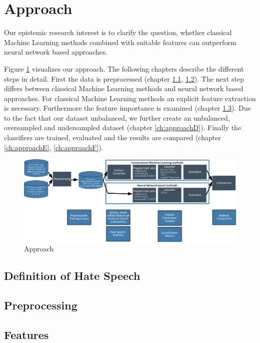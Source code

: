 \section{Approach} 
\label{approach}

Our epistemic research interest is to clarify the question, whether classical Machine Learning methods combined with suitable features can outperform neural network based approaches.

Figure \ref{fig:overall_pipeline} visualizes our approach. The following chapters describe the different steps in detail. First the data is preprocessed (chapter \ref{ch:approachA}, \ref{ch:approachB}). 
The next step differs between classical Machine Learning methods and neural network based approaches. For classical Machine Learning methods an explicit feature extraction is necessary. Furthermore the feature importance is ex\-am\-ined (chapter \ref{ch:approachC}). Due to the fact that our dataset unbalanced, we further create an unbalanced, oversampled and undersampled dataset (chapter \ref{ch:approachD}). Finally the classifiers are trained, evaluated and the results are compared (chapter \ref{ch:approachE}, \ref{ch:approachF}). 

\begin{figure}[ht]
	\centering
	\includegraphics[width=1.0\linewidth]{figures/pipeline.png}
	\caption{Approach}
	\label{fig:overall_pipeline}
\end{figure}

\subsection{Definition of Hate Speech} 
\label{ch:approachA}

\subsection{Preprocessing}
\label{ch:approachB}

\subsection{Features}
\label{ch:approachC}

